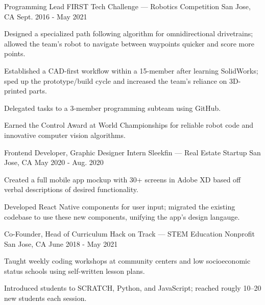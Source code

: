 
\begin{cventries}
  \cventry
  {Programming Lead} %
  {FIRST Tech Challenge --- Robotics Competition} %
  {San Jose, CA} %
  {Sept. 2016 - May 2021} %
  {
    \begin{cvitems} %
      \item {Designed a specialized path following algorithm for omnidirectional drivetrains; allowed the team's robot to navigate between waypoints quicker and score more points.}
      \item {Established a CAD-first workflow within a 15-member after learning SolidWorks; sped up the prototype/build cycle and increased the team's reliance on 3D-printed parts.}
      \item {Delegated tasks to a 3-member programming subteam using GitHub.}
      \item {Earned the Control Award at World Championships for reliable robot code and innovative computer vision algorithms.}
    \end{cvitems}
  }

  \cventry
  {Frontend Developer, Graphic Designer Intern} %
  {Sleekfin --- Real Estate Startup} %
  {San Jose, CA} %
  {May 2020 - Aug. 2020} %
  {
    \begin{cvitems} %
      \item {Created a full mobile app mockup with 30+ screens in Adobe XD based off verbal descriptions of desired functionality.}
      \item {Developed React Native components for user input; migrated the existing codebase to use these new components, unifying the app's design langauge.}
    \end{cvitems}
  }

  \cventry
  {Co-Founder, Head of Curriculum} %
  {Hack on Track --- STEM Education Nonprofit} %
  {San Jose, CA} %
  {June 2018 - May 2021} %
  {
    \begin{cvitems} %
      \item {Taught weekly coding workshops at community centers and low socioeconomic status schools using self-written lesson plans.}
      \item {Introduced students to SCRATCH, Python, and JavaScript; reached rougly 10--20 new students each session.}
    \end{cvitems}
  }
\end{cventries}
